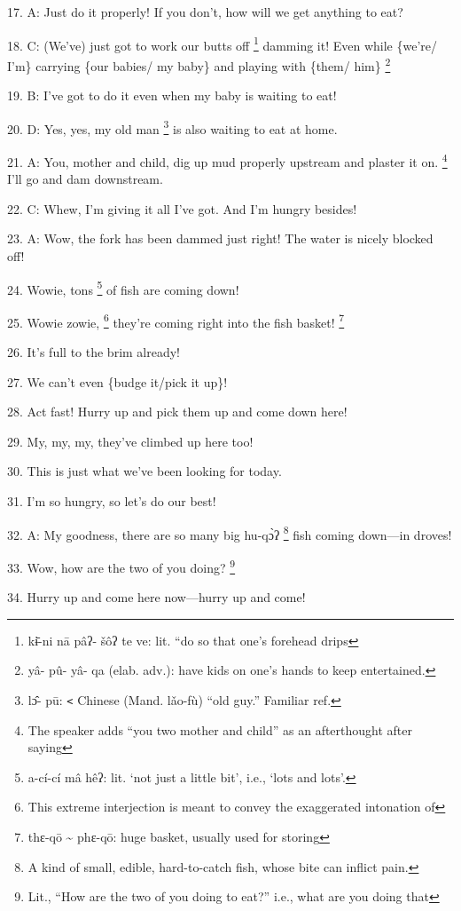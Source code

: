 17. A: Just do it properly! If you don't, how will we get anything to eat?

18. C: (We've) just got to work our butts off \footnote{kɨ̄-ni  nā  pâʔ- šôʔ  te  ve: lit. ``do so that one's forehead drips} damming it! Even while \{we're/
I'm\} carrying \{our babies/ my baby\} and playing with \{them/ him\} \footnote{yâ- pû- yâ- qa (elab. adv.): have kids on one's hands to keep entertained.}

19. B: I've got to do it even when my baby is waiting to eat!

20. D: Yes, yes, my old man \footnote{lɔ̂- pū: \texttt{<} Chinese (Mand. lǎo-fù) ``old guy.'' Familiar ref.} is also waiting to eat at home.

21. A: You, mother and child, dig up mud properly upstream and plaster it on. \footnote{The speaker adds ``you two mother and child'' as an afterthought after saying}
I'll go and dam downstream.

22. C: Whew, I'm giving it all I've got.  And I'm hungry besides!

23. A: Wow, the fork has been dammed just right! The water is nicely blocked off!

24. Wowie, tons \footnote{a-cí-cí mâ hêʔ: lit. `not just a little bit', i.e., `lots and lots'.} of fish are coming down!

25. Wowie zowie, \footnote{This extreme interjection is meant to convey the exaggerated intonation of} they're coming right into the fish basket! \footnote{thɛ-qō \textasciitilde{} phɛ-qō: huge basket, usually used for storing}

26. It's full to the brim already!

27. We can't even \{budge it/pick it up\}!

28. Act fast! Hurry up and pick them up and come down here!

29. My, my, my, they've climbed up here too!

30. This is just what we've been looking for today.

31. I'm so hungry, so let's do our best!

32. A: My goodness, there are so many big hu-qɔ̀ʔ \footnote{A kind of small, edible, hard-to-catch fish, whose bite can inflict pain.} fish coming down---in
droves!

33. Wow, how are the two of you doing? \footnote{Lit., ``How are the two of you doing to eat?'' i.e., what are you doing that}

34. Hurry up and come here now---hurry up and come!

